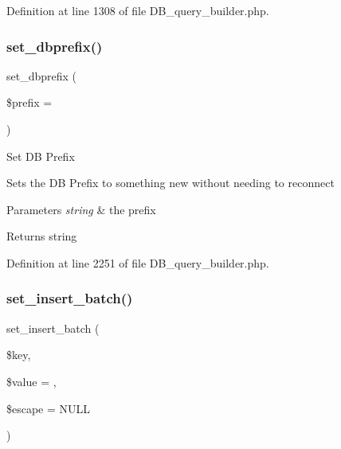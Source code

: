 Definition at line 1308 of file D\+B\+\_\+query\+\_\+builder.\+php.

\mbox{\label{class_c_i___d_b__query__builder_a5349738c8f19329c8e074be683cd9015}} 
\subsubsection{\texorpdfstring{set\_dbprefix()}{set\_dbprefix()}}
{\footnotesize\ttfamily set\+\_\+dbprefix (\begin{DoxyParamCaption}\item[{}]{\$prefix = {\ttfamily \textquotesingle{}\textquotesingle{}} }\end{DoxyParamCaption})}

Set DB Prefix

Set\textquotesingle{}s the DB Prefix to something new without needing to reconnect


\begin{DoxyParams}{Parameters}
{\em string} & the prefix \\
\hline
\end{DoxyParams}
\begin{DoxyReturn}{Returns}
string 
\end{DoxyReturn}


Definition at line 2251 of file D\+B\+\_\+query\+\_\+builder.\+php.

\mbox{\label{class_c_i___d_b__query__builder_a810cdf264ad4b8df2c02c59ad3197859}} 
\subsubsection{\texorpdfstring{set\_insert\_batch()}{set\_insert\_batch()}}
{\footnotesize\ttfamily set\+\_\+insert\+\_\+batch (\begin{DoxyParamCaption}\item[{}]{\$key,  }\item[{}]{\$value = {\ttfamily \textquotesingle{}\textquotesingle{}},  }\item[{}]{\$escape = {\ttfamily NULL} }\end{DoxyParamCaption})}


